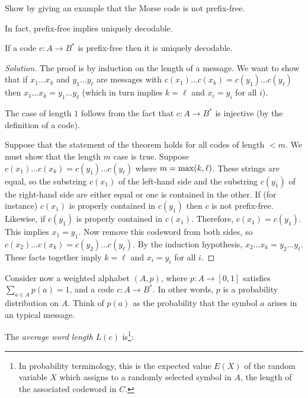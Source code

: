 \begin{exercise}
Show by giving an example that the Morse code is not prefix-free.
\end{exercise}


In fact, prefix-free implies uniquely decodable.

\begin{theorem}
{\rm
If a code $c:A\to B^*$ is prefix-free then it is uniquely decodable.
}
\end{theorem}

\begin{proof}[Solution]
The proof is by induction on the length of a message.
We want to show that if $x_1\dots x_k$ and $y_1\dots y_\ell$ are
messages with $c(x_1)\dots c(x_k)=c(y_1)\dots c(y_\ell)$
then  $x_1\dots x_k=y_1\dots y_\ell$ (which in turn implies
$k=\ell$ and $x_i=y_i$ for all $i$).

The case of length $1$ follows from the fact that
$c:A\to B^*$ is injective (by the definition of a code).

Suppose that the statement of the theorem holds for all
codes of length $<m$. We must show that the length $m$
case is true.
Suppose $c(x_1)\dots c(x_k)=c(y_1)\dots c(y_\ell)$ where
$m={\rm max}(k,\ell)$. These strings are equal, so the
substring $c(x_1)$ of the left-hand side and the substring $c(y_1)$
of the right-hand side are either equal or one is contained in the other.
If (for instance) $c(x_1)$ is properly contained in $c(y_1)$ then
$c$ is not prefix-free. Likewise, if $c(y_1)$ is properly contained in
$c(x_1)$. Therefore, $c(x_1)=c(y_1)$. This implies $x_1=y_1$.
Now remove this
codeword from both sides, so $c(x_2)\dots c(x_k)=c(y_2)\dots c(y_\ell)$.
By the induction hypothesis, $x_2\dots x_k=y_2\dots y_\ell$.
These facts together imply $k=\ell$ and $x_i=y_i$ for all $i$.
\end{proof}


Consider now a weighted alphabet $(A,p)$, where
$p:A\to [0,1]$ satisfies $\sum_{a\in A}p(a)=1$,
and a code $c:A\to B^*$.
In other words, $p$ is a probability distribution on $A$.
Think of $p(a)$ as the probability that the symbol $a$
arises in an typical message.

The {\it average word length} $L(c)$ is\footnote{In probability terminology,
this is the expected value $E(X)$ of the
random variable $X$ which assigns to a randomly selected
symbol in $A$, the length of the associated codeword in $C$.}:

